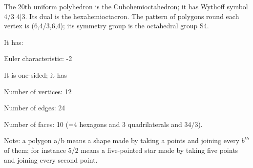 The 20th uniform polyhedron is the Cubohemioctahedron; it has Wythoff symbol 4/3 4|3. Its dual is the hexahemioctacron. The pattern of polygons round each vertex is (6,4/3,6,4); its symmetry group is the octahedral group S4.\par
It has:\par
Euler characteristic: -2\par
It is one-sided; it has\par
Number of vertices: 12\par
Number of edges:  24\par
Number of faces: 10 (=4 hexagons and 3 quadrilaterals and 3{4/3}).\par
Note: a polygon a/b means a shape made by taking a points and joining every $b^{th}$  of them; for instance 5/2 means a five-pointed star made by taking five points and joining every second point.